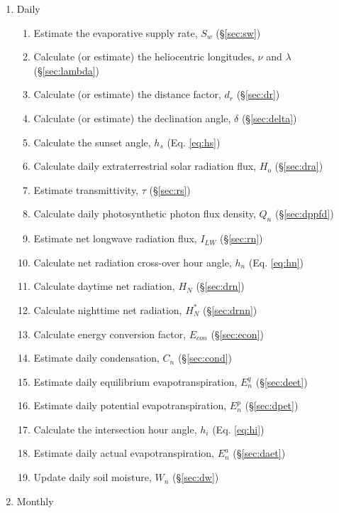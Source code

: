 \begin{enumerate}
	\item Daily
	\begin{enumerate}
		\item Estimate the evaporative supply rate, $S_w$ (\S \ref{sec:sw})
		\item Calculate (or estimate) the heliocentric longitudes, 
		      $\nu$ and $\lambda$ (\S \ref{sec:lambda})
		\item Calculate (or estimate) the distance factor, $d_r$ 
		      (\S \ref{sec:dr})
		\item Calculate (or estimate) the declination angle, $\delta$ 
		      (\S \ref{sec:delta})
		\item Calculate the sunset angle, $h_s$ (Eq. \ref{eq:hs})
		\item Calculate daily extraterrestrial solar radiation flux, $H_o$ 
		      (\S \ref{sec:dra})
		\item Estimate transmittivity, $\tau$ (\S \ref{sec:rs})
		\item Calculate daily photosynthetic photon flux density, $Q_n$ 
		      (\S \ref{sec:dppfd})
		\item Estimate net longwave radiation flux, $I_{LW}$ (\S \ref{sec:rn})
		\item Calculate net radiation cross-over hour angle, $h_n$ 
		      (Eq. \ref{eq:hn})
		\item Calculate daytime net radiation, $H_{N}$ (\S \ref{sec:drn})
		\item Calculate nighttime net radiation, $H_{N}^{\ast}$ (\S \ref{sec:drnn})
		\item Calculate energy conversion factor, $E_{con}$ (\S \ref{sec:econ})
		\item Estimate daily condensation, $C_n$ (\S \ref{sec:cond})
		\item Estimate daily equilibrium evapotranspiration, $E_n^q$ 
		      (\S \ref{sec:deet})
		\item Estimate daily potential evapotranspiration, $E_n^p$ 
		      (\S \ref{sec:dpet})
		\item Calculate the intersection hour angle, $h_i$ (Eq. \ref{eq:hi})
		\item Estimate daily actual evapotranspiration, $E_n^a$ 
		      (\S \ref{sec:daet})
		\item Update daily soil moisture, $W_n$ (\S \ref{sec:dw})
	\end{enumerate}
	\item Monthly
	\begin{enumerate}

\end{enumerate}
\end{enumerate}
